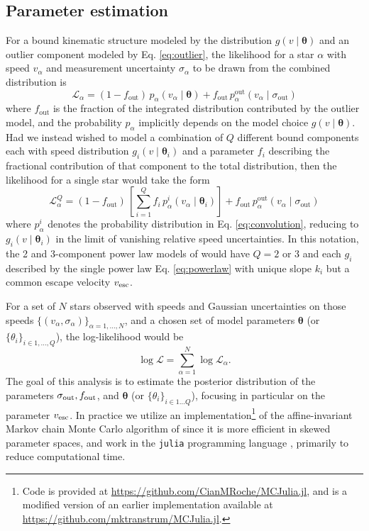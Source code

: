 \subsection{Parameter estimation}
For a bound kinematic structure modeled by the distribution $g(v \mid \mathbf{\theta})$ and an outlier component modeled by Eq. \ref{eq:outlier}, the likelihood for a star $\alpha$ with speed $v_\alpha$ and measurement uncertainty $\sigma_\alpha$ to be drawn from the combined distribution is 
\begin{equation}
    \mathcal{L}_\alpha=(1-f_\mathrm{out})\, p_\alpha\left(v_\alpha \mid \mathbf{\theta}\right)+f_\mathrm{out} \,p_\alpha^{\mathrm{out}}\left(v_\alpha \mid \sigma_{\mathrm{out}}\right)
\end{equation}
where $f_\mathrm{out}$ is the fraction of the integrated distribution contributed by the outlier model, and the probability $p_\alpha$ implicitly depends on the model choice $g(v \mid \mathbf{\theta})$. Had we instead wished to model a combination of $Q$ different bound components each with speed distribution $g_i(v \mid \mathbf{\theta}_i)$ and a parameter $f_i$ describing the fractional contribution of that component to the total distribution, then the likelihood for a single star would take the form
\begin{equation}\label{eq:multiple_components}
    \mathcal{L}_\alpha^{Q}=(1-f_\mathrm{out})\, \left[\sum_{i =1}^Q f_i\, p_\alpha^i\left(v_\alpha \mid \mathbf{\theta}_i \right)\right]+f_\mathrm{out} \,p_\alpha^{\mathrm{out}}\left(v_\alpha \mid \sigma_{\mathrm{out}}\right)
\end{equation}
where $p_\alpha^i$ denotes the probability distribution in Eq. \ref{eq:convolution}, reducing to $g_i(v \mid \mathbf{\theta}_i)$ in the limit of vanishing relative speed uncertainties. In this notation, the 2 and 3-component power law models of \cite{Necib2022methods,Necib2022} would have $Q = 2$ or $3$ and each $g_i$ described by the single power law Eq. \ref{eq:powerlaw} with unique slope $k_i$ but a common escape velocity $v_{\rm{esc}}$.

For a set of $N$ stars observed with speeds and Gaussian uncertainties on those speeds $\{(v_\alpha, \sigma_\alpha)\}_{\alpha = 1,\dots,N}$, and a chosen set of model parameters $\mathbf{\theta}$ (or $\{\theta_i\}_{i\in 1,\dots ,Q}$), the log-likelihood would be
\begin{equation}
    \log \mathcal{L} = \sum_{\alpha=1}^N \log \mathcal{L}_\alpha.
\end{equation}
The goal of this analysis is to estimate the posterior distribution of the parameters $\sigma_{\rm{out}}, f_{\rm{out}}$, and $\mathbf{\theta}$ (or $\{\theta_i\}_{i\in 1\dots Q}$), focusing in particular on the parameter $v_{\rm{esc}}$. In practice we utilize an implementation\footnote{Code is provided at \url{https://github.com/CianMRoche/MCJulia.jl}, and is a modified version of an earlier implementation available at \url{https://github.com/mktranstrum/MCJulia.jl}.} of the affine-invariant Markov chain Monte Carlo algorithm of \cite{AIMCMC} since it is more efficient in skewed parameter spaces, and work in the \texttt{julia} programming language \citep{julia}, primarily to reduce computational time.

